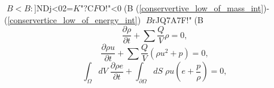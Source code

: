 $B<B:]$NDj<02=$K$"$?$C$F$O!"<0(B
(\ref{conservertive_low_of_mass_int})-(\ref{conservertice_low_of_energy_int})
$B$rJQ7A$7$F!"(B
\begin{equation}
 \frac{\partial\rho}{\partial t}  
 + \sum \frac{Q}{V} \rho =  0, 
 \label{conservertive_low_of_mass_sum}
\end{equation}
\begin{equation}
 \frac{\partial \rho u}{\partial t} 
 + \sum \frac{Q}{V} \left(\rho u^2 + p\right) = 0,
   \label{conservertive_low_of_momentum_sum}
\end{equation}
\begin{equation}
 \int_{\Omega} dV \mspace{5mu} \frac{\partial \rho e}{\partial t} 
  + \int_{\partial\Omega} dS \mspace{5mu} \rho u \left(e+\frac{p}{\rho}\right) = 0,
   \label{conservertive_low_of_energy_sum}
\end{equation}
